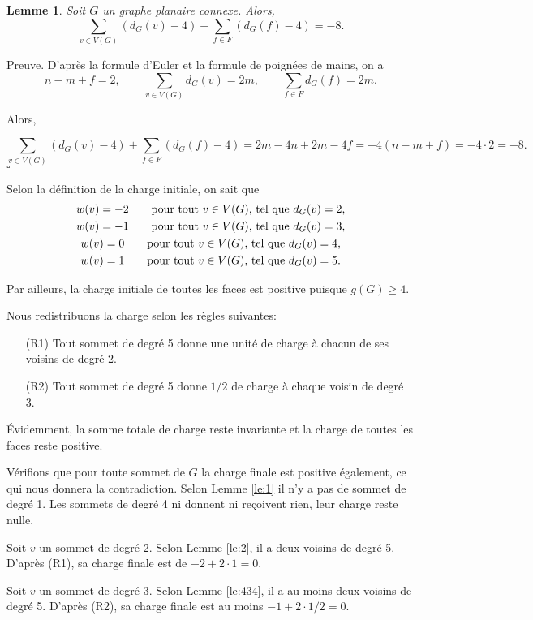 \documentclass[10pt,a4paper]{article}
\newtheorem{lemme}{Lemme}
\newcommand{\ep}{{\hfill $\square$}}
\begin{document}
\begin{lemme}
Soit $G$ un graphe planaire connexe. Alors,
$$ \sum_{v \in V(G)} (d_G(v) - 4) + \sum_{f\in F} (d_G(f) -4) = -8.$$
\label{le:charge}
\end{lemme}

Preuve.
D'après la formule d'Euler et la formule de poignées de mains, on a
$$ 
n - m + f = 2, \qquad
\sum_{v\in V(G)} d_G(v) = 2m, \qquad
\sum_{f\in F} d_G(f) = 2m. 
$$

Alors,

$$ \sum_{v \in V(G)} (d_G(v) - 4) + \sum_{f\in F} (d_G(f) -4) = 2m -4n + 2m - 4f = -4(n - m + f) = -4\cdot 2 = -8.$$
\ep 

Selon la définition de la charge initiale, on sait que
$$ 
\gathered
w(v) = -2 \qquad \textrm{pour tout $v \in V(G)$, tel que } d_G(v) = 2, \\
w(v) = -1 \qquad \textrm{pour tout $v \in V(G)$, tel que } d_G(v) = 3, \\
w(v) =  0 \qquad \textrm{pour tout $v \in V(G)$, tel que } d_G(v) = 4, \\
w(v) =  1 \qquad \textrm{pour tout $v \in V(G)$, tel que } d_G(v) = 5.
\endgathered
$$

Par ailleurs, la charge initiale de toutes les faces est positive puisque $g(G)\ge 4$.

Nous redistribuons la charge selon les règles suivantes:
\begin{enumerate}
\item[(R1)] Tout sommet de degré 5 donne une unité de charge à chacun de ses voisins de degré 2.
\item[(R2)] Tout sommet de degré 5 donne $1/2$ de charge à chaque voisin de degré 3.
\end{enumerate}

Évidemment, la somme totale de charge reste invariante et la charge de toutes les faces reste positive.

Vérifions que pour toute sommet de $G$ la charge finale est positive également, ce qui nous donnera la contradiction.
Selon Lemme \ref{le:1} il n'y a pas de sommet de degré 1.
Les sommets de degré 4 ni donnent ni reçoivent rien, leur charge reste nulle.

Soit $v$ un sommet de degré 2. Selon Lemme \ref{le:2}, il a deux voisins de degré 5. D'après (R1), sa charge finale est de $-2 + 2\cdot 1=0$.

Soit $v$ un sommet de degré 3. Selon Lemme \ref{le:434}, il a au moins deux voisins de degré 5. D'après (R2), sa charge finale est au moins $-1 + 2\cdot 1/2 = 0$.
\end{document}
